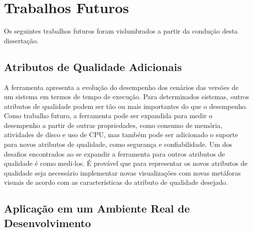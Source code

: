 

\section{Trabalhos Futuros} \label{sec:consideracoes-trabalhos-futuros}

Os seguintes trabalhos futuros foram vislumbrados a partir da condução desta dissertação.

\subsection{Atributos de Qualidade Adicionais}

A ferramenta apresenta a evolução do desempenho dos cenários das versões de um sistema em termos de tempo de execução. Para determinados sistemas, outros atributos de qualidade podem ser tão ou mais importantes do que o desempenho. Como trabalho futuro, a ferramenta pode ser expandida para medir o desempenho a partir de outras propriedades, como consumo de memória, atividades de disco e uso de CPU, mas também pode ser adicionado o suporte para novos atributos de qualidade, como segurança e confiabilidade. Um dos desafios encontrados ao se expandir a ferramenta para outros atributos de qualidade é como medi-los. É provável que para representar os novos atributos de qualidade seja necessário implementar novas visualizações com novas metáforas visuais de acordo com as características do atributo de qualidade desejado.

\subsection{Aplicação em um Ambiente Real de Desenvolvimento}


